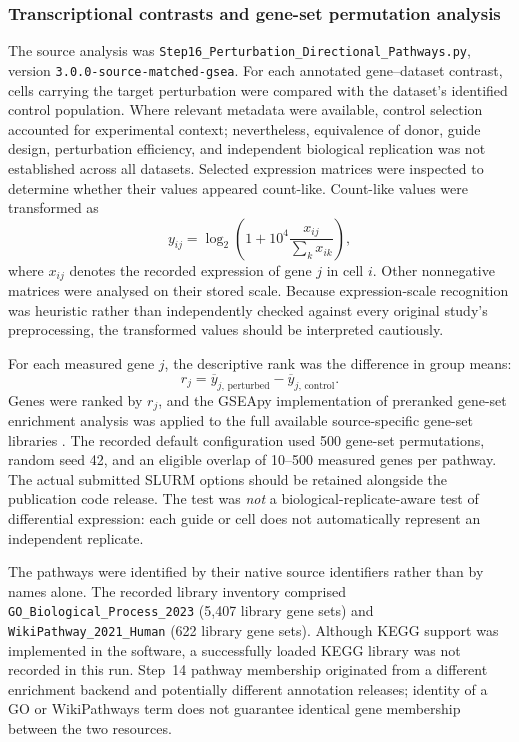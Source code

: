 \documentclass[11pt,a4paper]{article}
\begin{document}
\subsubsection{Transcriptional contrasts and gene-set permutation analysis}
\label{subsec:step16_methods}
The source analysis was \nolinkurl{Step16_Perturbation_Directional_Pathways.py}, version \nolinkurl{3.0.0-source-matched-gsea}. For each annotated gene--dataset contrast, cells carrying the target perturbation were compared with the dataset's identified control population. Where relevant metadata were available, control selection accounted for experimental context; nevertheless, equivalence of donor, guide design, perturbation efficiency, and independent biological replication was not established across all datasets. Selected expression matrices were inspected to determine whether their values appeared count-like. Count-like values were transformed as
\begin{equation}
  y_{ij}=\log_{2}\left(1+10^{4}\frac{x_{ij}}{\sum_{k}x_{ik}}\right),
  \label{eq:step16_cptt}
\end{equation}
where $x_{ij}$ denotes the recorded expression of gene $j$ in cell $i$. Other nonnegative matrices were analysed on their stored scale. Because expression-scale recognition was heuristic rather than independently checked against every original study's preprocessing, the transformed values should be interpreted cautiously.

For each measured gene $j$, the descriptive rank was the difference in group means:
\begin{equation}
  r_j=\overline{y}_{j,\,\mathrm{perturbed}}-\overline{y}_{j,\,\mathrm{control}}.
  \label{eq:step16_rank}
\end{equation}
Genes were ranked by $r_j$, and the GSEApy implementation of preranked gene-set enrichment analysis was applied to the full available source-specific gene-set libraries \cite{Subramanian2005GSEA}. The recorded default configuration used 500 gene-set permutations, random seed 42, and an eligible overlap of 10--500 measured genes per pathway. The actual submitted SLURM options should be retained alongside the publication code release. The test was \emph{not} a biological-replicate-aware test of differential expression: each guide or cell does not automatically represent an independent replicate.

The pathways were identified by their native source identifiers rather than by names alone. The recorded library inventory comprised \texttt{GO\_Biological\_Process\_2023} (5,407 library gene sets) and \texttt{WikiPathway\_2021\_Human} (622 library gene sets). Although KEGG support was implemented in the software, a successfully loaded KEGG library was not recorded in this run. Step~14 pathway membership originated from a different enrichment backend and potentially different annotation releases; identity of a GO or WikiPathways term does not guarantee identical gene membership between the two resources.
\end{document}
